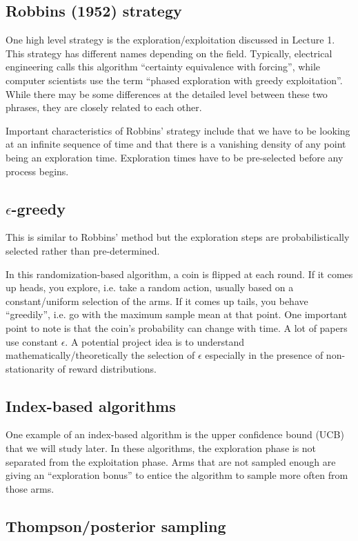 \documentclass[11pt]{article}
\begin{document}
\subsection{Robbins (1952) strategy}
One high level strategy is the exploration/exploitation discussed in Lecture 1.  This strategy has different names depending on the field.  Typically, electrical engineering calls this algorithm ``certainty equivalence with forcing'', while computer scientists use the term ``phased exploration with greedy exploitation''.  While there may be some differences at the detailed level between these two phrases, they are closely related to each other.

Important characteristics of Robbins' strategy include that we have to be looking at an infinite sequence of time and that there is a vanishing density of any point being an exploration time.  Exploration times have to be pre-selected before any process begins. 

\subsection{$\epsilon$-greedy}
This is similar to Robbins' method but the exploration steps are probabilistically selected rather than pre-determined.

In this randomization-based algorithm, a coin is flipped at each round.  If it comes up heads, you explore, i.e. take a random action, usually based on a constant/uniform selection of the arms.  If it comes up tails, you behave ``greedily'', i.e. go with the maximum sample mean at that point.  One important point to note is that the coin's probability can change with time.  A lot of papers use constant $\epsilon$.  A potential project idea is to understand mathematically/theoretically the selection of $\epsilon$ especially in the presence of non-stationarity of reward distributions.  

\subsection{Index-based algorithms}
One example of an index-based algorithm is the upper confidence bound (UCB) that we will study later.  In these algorithms, the exploration phase is not separated from the exploitation phase.  Arms that are not sampled enough are giving an ``exploration bonus'' to entice the algorithm to sample more often from those arms.

\subsection{Thompson/posterior sampling}
\end{document}
